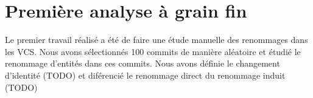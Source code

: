 \section{Première analyse à grain fin}
\label{sec:analyse_fin_grain}

Le premier travail réalisé a été de faire une étude manuelle des renommages dans les VCS. Nous avons sélectionnés 100 commits de manière aléatoire et étudié le renommage d'entités dans ces commits. Nous avons définie le changement d'identité (TODO) et diférencié le renommage direct du renommage induit (TODO)\\
